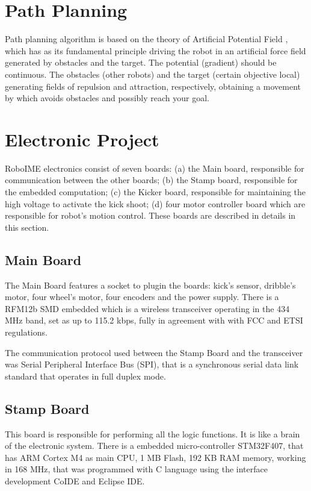 \documentclass{llncs}
\begin{document}
\section{Path Planning}

Path planning algorithm is based on the theory of Artificial Potential Field \cite{CPA}, which has as its fundamental principle driving the robot in an artificial force field generated by obstacles and the target. The potential (gradient) should be continuous. The obstacles (other robots) and the target (certain objective local) generating fields of repulsion and attraction, respectively, obtaining a movement by which avoids obstacles and possibly reach your goal.


\section{Electronic Project}
RoboIME electronics consist of seven boards: (a) the Main board, responsible for communication between the other boards; (b) the Stamp board,  responsible  for the embedded computation; (c) the Kicker board, responsible for maintaining the high voltage to activate the kick shoot; (d) four motor controller board which are responsible for robot's motion control. These boards are described in details in this section.

\subsection{Main Board}
The Main Board features a socket to plugin the boards: kick's sensor, dribble's motor, four wheel's motor, four encoders and the power supply. There is a RFM12b SMD embedded which is a wireless transceiver operating in the 434 MHz band, set as up to 115.2 kbps, fully in agreement with with FCC and ETSI regulations.

The communication protocol used between the Stamp Board and the transceiver was Serial Peripheral Interface Bus (SPI), that  is a synchronous serial data link standard that operates in full duplex mode.

\subsection{Stamp Board}
This board is responsible  for performing all the logic functions. It is like a brain of the electronic system. There is a embedded micro-controller STM32F407, that has ARM Cortex M4 as main CPU, 1 MB Flash, 192 KB RAM memory, working in 168 MHz, that was programmed with C language using the  interface development CoIDE and Eclipse IDE.
\end{document}
